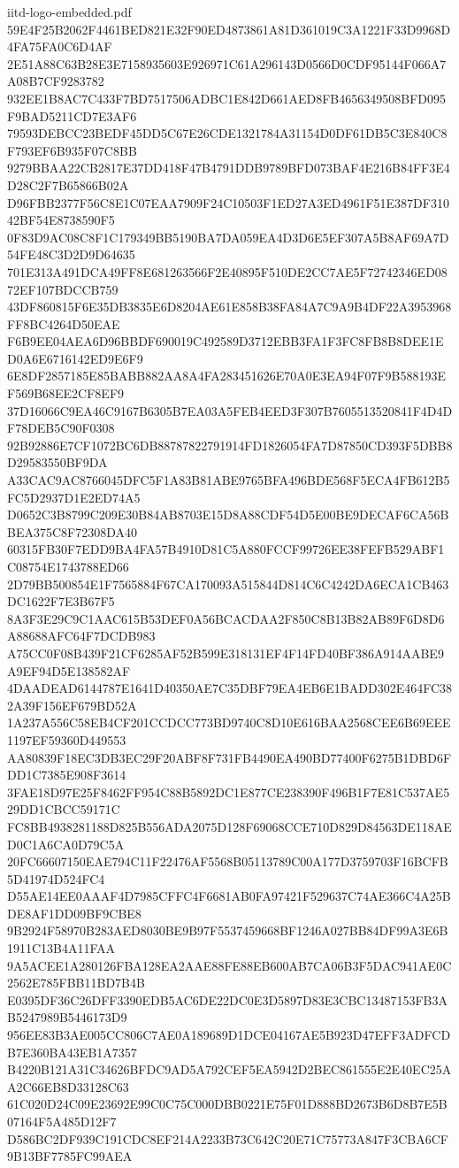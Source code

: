 \begin{filecontents*}[overwrite]{iitd-logo-embedded.pdf}
59E4F25B2062F4461BED821E32F90ED4873861A81D361019C3A1221F33D9968D4FA75FA0C6D4AF
2E51A88C63B28E3E7158935603E926971C61A296143D0566D0CDF95144F066A7A08B7CF9283782
932EE1B8AC7C433F7BD7517506ADBC1E842D661AED8FB4656349508BFD095F9BAD5211CD7E3AF6
79593DEBCC23BEDF45DD5C67E26CDE1321784A31154D0DF61DB5C3E840C8F793EF6B935F07C8BB
9279BBAA22CB2817E37DD418F47B4791DDB9789BFD073BAF4E216B84FF3E4D28C2F7B65866B02A
D96FBB2377F56C8E1C07EAA7909F24C10503F1ED27A3ED4961F51E387DF31042BF54E8738590F5
0F83D9AC08C8F1C179349BB5190BA7DA059EA4D3D6E5EF307A5B8AF69A7D54FE48C3D2D9D64635
701E313A491DCA49FF8E681263566F2E40895F510DE2CC7AE5F72742346ED0872EF107BDCCB759
43DF860815F6E35DB3835E6D8204AE61E858B38FA84A7C9A9B4DF22A3953968FF8BC4264D50EAE
F6B9EE04AEA6D96BBDF690019C492589D3712EBB3FA1F3FC8FB8B8DEE1ED0A6E6716142ED9E6F9
6E8DF2857185E85BABB882AA8A4FA283451626E70A0E3EA94F07F9B588193EF569B68EE2CF8EF9
37D16066C9EA46C9167B6305B7EA03A5FEB4EED3F307B7605513520841F4D4DF78DEB5C90F0308
92B92886E7CF1072BC6DB88787822791914FD1826054FA7D87850CD393F5DBB8D29583550BF9DA
A33CAC9AC8766045DFC5F1A83B81ABE9765BFA496BDE568F5ECA4FB612B5FC5D2937D1E2ED74A5
D0652C3B8799C209E30B84AB8703E15D8A88CDF54D5E00BE9DECAF6CA56BBEA375C8F72308DA40
60315FB30F7EDD9BA4FA57B4910D81C5A880FCCF99726EE38FEFB529ABF1C08754E1743788ED66
2D79BB500854E1F7565884F67CA170093A515844D814C6C4242DA6ECA1CB463DC1622F7E3B67F5
8A3F3E29C9C1AAC615B53DEF0A56BCACDAA2F850C8B13B82AB89F6D8D6A88688AFC64F7DCDB983
A75CC0F08B439F21CF6285AF52B599E318131EF4F14FD40BF386A914AABE9A9EF94D5E138582AF
4DAADEAD6144787E1641D40350AE7C35DBF79EA4EB6E1BADD302E464FC382A39F156EF679BD52A
1A237A556C58EB4CF201CCDCC773BD9740C8D10E616BAA2568CEE6B69EEE1197EF59360D449553
AA80839F18EC3DB3EC29F20ABF8F731FB4490EA490BD77400F6275B1DBD6FDD1C7385E908F3614
3FAE18D97E25F8462FF954C88B5892DC1E877CE238390F496B1F7E81C537AE529DD1CBCC59171C
FC8BB4938281188D825B556ADA2075D128F69068CCE710D829D84563DE118AED0C1A6CA0D79C5A
20FC66607150EAE794C11F22476AF5568B05113789C00A177D3759703F16BCFB5D41974D524FC4
D55AE14EE0AAAF4D7985CFFC4F6681AB0FA97421F529637C74AE366C4A25BDE8AF1DD09BF9CBE8
9B2924F58970B283AED8030BE9B97F5537459668BF1246A027BB84DF99A3E6B1911C13B4A11FAA
9A5ACEE1A280126FBA128EA2AAE88FE88EB600AB7CA06B3F5DAC941AE0C2562E785FBB11BD7B4B
E0395DF36C26DFF3390EDB5AC6DE22DC0E3D5897D83E3CBC13487153FB3AB5247989B5446173D9
956EE83B3AE005CC806C7AE0A189689D1DCE04167AE5B923D47EFF3ADFCDB7E360BA43EB1A7357
B4220B121A31C34626BFDC9AD5A792CEF5EA5942D2BEC861555E2E40EC25AA2C66EB8D33128C63
61C020D24C09E23692E99C0C75C000DBB0221E75F01D888BD2673B6D8B7E5B07164F5A485D12F7
D586BC2DF939C191CDC8EF214A2233B73C642C20E71C75773A847F3CBA6CF9B13BF7785FC99AEA

\end{filecontents*}

